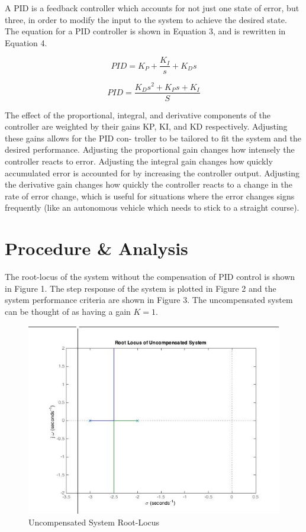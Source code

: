 \documentclass[12pt]{article}
\begin{document}
A PID is a feedback controller which accounts for not just one state of error, but three, in order to modify the input to the system to achieve the desired state. The equation for a PID controller is shown in Equation 3, and is rewritten in Equation 4.
\bigskip

\begin{equation}
PID= K_{P} + \frac{K_{I}}{s} + K_{D}s
\end{equation}

\begin{equation}
PID= \frac{K_{D}s^2 + K_{P}s + K_{I}}{S}
\end{equation}
\bigskip

The effect of the proportional, integral, and derivative components of the controller are weighted by their gains KP, KI, and KD respectively. Adjusting these gains allows for the PID con- troller to be tailored to fit the system and the desired performance. Adjusting the proportional
gain changes how intensely the controller reacts to error. Adjusting the integral gain changes
how quickly accumulated error is accounted for by increasing the controller output. Adjusting the derivative gain changes how quickly the controller reacts to a change in the rate of error change, which is useful for situations where the error changes signs frequently (like an autonomous vehicle which needs to stick to a straight course).
\bigskip


\section*{\fontsize{12}{12}\selectfont \large Procedure \& Analysis}
The root-locus of the system without the compensation of PID control is shown in Figure 1. The step response of the system is plotted in Figure 2 and the system performance criteria are shown in Figure 3. The uncompensated system can be thought of as having a gain $K = 1$.
\bigskip

\begin{figure}[h!] %
   \centering
   \includegraphics[width=4.5in]{uncompensated_root_locus.jpg} 
   \caption{Uncompensated System Root-Locus}
   \label{fig:example}
\end{figure}
\end{document}
